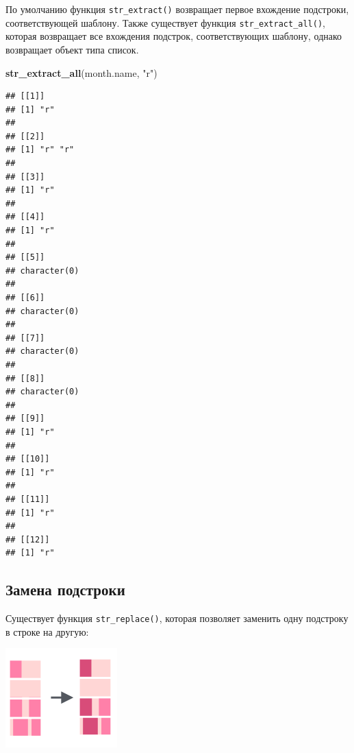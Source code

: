 \documentclass[
]{book}
\newenvironment{Shaded}{\begin{snugshade}}{\end{snugshade}}
\newcommand{\DataTypeTok}[1]{\textcolor[rgb]{0.13,0.29,0.53}{#1}}
\newcommand{\KeywordTok}[1]{\textcolor[rgb]{0.13,0.29,0.53}{\textbf{#1}}}
\newcommand{\NormalTok}[1]{#1}
\newcommand{\OperatorTok}[1]{\textcolor[rgb]{0.81,0.36,0.00}{\textbf{#1}}}
\newcommand{\StringTok}[1]{\textcolor[rgb]{0.31,0.60,0.02}{#1}}
\begin{document}
По умолчанию функция \texttt{str\_extract()} возвращает первое вхождение подстроки, соответствующей шаблону. Также существует функция \texttt{str\_extract\_all()}, которая возвращает все вхождения подстрок, соответствующих шаблону, однако возвращает объект типа список.

\begin{Shaded}
\begin{Highlighting}[]
\KeywordTok{str_extract_all}\NormalTok{(month.name, }\StringTok{"r"}\NormalTok{)}
\end{Highlighting}
\end{Shaded}

\begin{verbatim}
## [[1]]
## [1] "r"
## 
## [[2]]
## [1] "r" "r"
## 
## [[3]]
## [1] "r"
## 
## [[4]]
## [1] "r"
## 
## [[5]]
## character(0)
## 
## [[6]]
## character(0)
## 
## [[7]]
## character(0)
## 
## [[8]]
## character(0)
## 
## [[9]]
## [1] "r"
## 
## [[10]]
## [1] "r"
## 
## [[11]]
## [1] "r"
## 
## [[12]]
## [1] "r"
\end{verbatim}

\hypertarget{ux437ux430ux43cux435ux43dux430-ux43fux43eux434ux441ux442ux440ux43eux43aux438}{%
\subsection{Замена подстроки}\label{ux437ux430ux43cux435ux43dux430-ux43fux43eux434ux441ux442ux440ux43eux43aux438}}

Существует функция \texttt{str\_replace()}, которая позволяет заменить одну подстроку в строке на другую:

\includegraphics{images/5.11_str_replace.png}

\begin{Shaded}
\end{Shaded}
\end{document}
